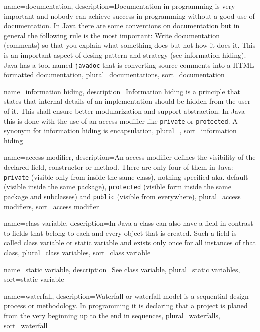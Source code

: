 {
	name=documentation,
	description={Documentation in programming is very important and nobody
		can achieve success in programming without a good use of
		documentation. In Java there are some conventions on 
		documentation but in general the following rule is the most
		important: Write documentation (comments) so that you 
		explain what something does but not how it does it. This is
		an important aspect of desing pattern and strategy (see
		\gls{information hiding}). 
		Java has a tool named \lstinline!javadoc!
		that is converting source comments into a HTML formatted
		documentation},
	plural=documentations,
	sort=documentation
}

{
	name={information hiding},
	description={Information hiding is a principle that states that 
		internal details of an implementation should be hidden
		from the user of it. 
		This shall ensure better modularization
		and support abstraction. In Java this is done with the use
		of an \gls{access modifier} like \lstinline!private! or
		\lstinline!protected!. A synonym for information 
		hiding is \gls{encapsulation}},
	plural={},
	sort={information hiding}
}

{
	name={access modifier},
	description={An access modifier defines the visibility of the 
		declared field, constructor or method. There are only four of
		them in Java: 
		\lstinline!private! (visible only from inside the same class), 
		nothing specified aka. default (visible inside the same package),
		\lstinline!protected! (visible form inside the same package 
			and subclasses) and
		\lstinline!public! (visible from everywhere)},
	plural={access modifiers},
	sort={access modifier}
}

{
	name={class variable},
	description={In Java a class can also have a field in contrast to 
		fields that belong to each and every object that is created.
		Such a field is called class variable or 
		\gls{static variable} and exists only once for all instances
		of that class},
	plural={class variables},
	sort={class variable}
}

{
	name={static variable},
	description={See \gls{class variable}},
	plural={static variables},
	sort={static variable}	
}

{
	name=waterfall,
	description={Waterfall or waterfall model is a sequential design 
		process or methodology. In programming it is declaring 
		that a project is planed from the very beginning up to 
		the end in sequences},
	plural=waterfalls,
	sort=waterfall
}


